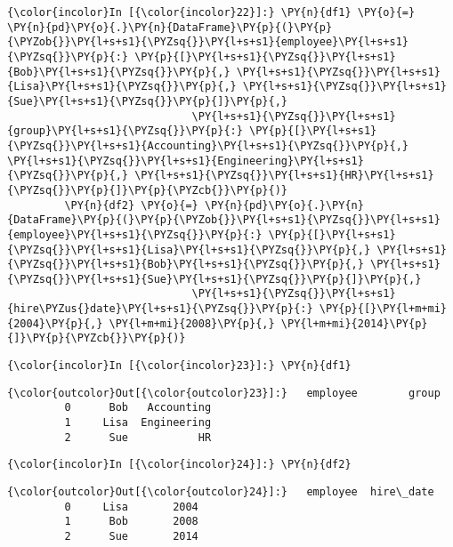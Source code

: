     \begin{Verbatim}[commandchars=\\\{\}]
{\color{incolor}In [{\color{incolor}22}]:} \PY{n}{df1} \PY{o}{=} \PY{n}{pd}\PY{o}{.}\PY{n}{DataFrame}\PY{p}{(}\PY{p}{\PYZob{}}\PY{l+s+s1}{\PYZsq{}}\PY{l+s+s1}{employee}\PY{l+s+s1}{\PYZsq{}}\PY{p}{:} \PY{p}{[}\PY{l+s+s1}{\PYZsq{}}\PY{l+s+s1}{Bob}\PY{l+s+s1}{\PYZsq{}}\PY{p}{,} \PY{l+s+s1}{\PYZsq{}}\PY{l+s+s1}{Lisa}\PY{l+s+s1}{\PYZsq{}}\PY{p}{,} \PY{l+s+s1}{\PYZsq{}}\PY{l+s+s1}{Sue}\PY{l+s+s1}{\PYZsq{}}\PY{p}{]}\PY{p}{,}
                             \PY{l+s+s1}{\PYZsq{}}\PY{l+s+s1}{group}\PY{l+s+s1}{\PYZsq{}}\PY{p}{:} \PY{p}{[}\PY{l+s+s1}{\PYZsq{}}\PY{l+s+s1}{Accounting}\PY{l+s+s1}{\PYZsq{}}\PY{p}{,} \PY{l+s+s1}{\PYZsq{}}\PY{l+s+s1}{Engineering}\PY{l+s+s1}{\PYZsq{}}\PY{p}{,} \PY{l+s+s1}{\PYZsq{}}\PY{l+s+s1}{HR}\PY{l+s+s1}{\PYZsq{}}\PY{p}{]}\PY{p}{\PYZcb{}}\PY{p}{)}
         \PY{n}{df2} \PY{o}{=} \PY{n}{pd}\PY{o}{.}\PY{n}{DataFrame}\PY{p}{(}\PY{p}{\PYZob{}}\PY{l+s+s1}{\PYZsq{}}\PY{l+s+s1}{employee}\PY{l+s+s1}{\PYZsq{}}\PY{p}{:} \PY{p}{[}\PY{l+s+s1}{\PYZsq{}}\PY{l+s+s1}{Lisa}\PY{l+s+s1}{\PYZsq{}}\PY{p}{,} \PY{l+s+s1}{\PYZsq{}}\PY{l+s+s1}{Bob}\PY{l+s+s1}{\PYZsq{}}\PY{p}{,} \PY{l+s+s1}{\PYZsq{}}\PY{l+s+s1}{Sue}\PY{l+s+s1}{\PYZsq{}}\PY{p}{]}\PY{p}{,}
                             \PY{l+s+s1}{\PYZsq{}}\PY{l+s+s1}{hire\PYZus{}date}\PY{l+s+s1}{\PYZsq{}}\PY{p}{:} \PY{p}{[}\PY{l+m+mi}{2004}\PY{p}{,} \PY{l+m+mi}{2008}\PY{p}{,} \PY{l+m+mi}{2014}\PY{p}{]}\PY{p}{\PYZcb{}}\PY{p}{)}
\end{Verbatim}


    \begin{Verbatim}[commandchars=\\\{\}]
{\color{incolor}In [{\color{incolor}23}]:} \PY{n}{df1}
\end{Verbatim}


\begin{Verbatim}[commandchars=\\\{\}]
{\color{outcolor}Out[{\color{outcolor}23}]:}   employee        group
         0      Bob   Accounting
         1     Lisa  Engineering
         2      Sue           HR
\end{Verbatim}
            
    \begin{Verbatim}[commandchars=\\\{\}]
{\color{incolor}In [{\color{incolor}24}]:} \PY{n}{df2}
\end{Verbatim}


\begin{Verbatim}[commandchars=\\\{\}]
{\color{outcolor}Out[{\color{outcolor}24}]:}   employee  hire\_date
         0     Lisa       2004
         1      Bob       2008
         2      Sue       2014
\end{Verbatim}
            

